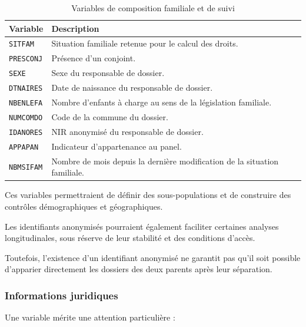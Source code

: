 \documentclass[11pt,a4paper]{article}
\begin{document}
\begin{table}[H]
\centering
\caption{Variables de composition familiale et de suivi}
\small
\begin{tabular}{p{2.4cm}p{10.6cm}}
\toprule
\textbf{Variable} & \textbf{Description} \\
\midrule
\texttt{SITFAM} &
Situation familiale retenue
pour le calcul des droits. \\

\texttt{PRESCONJ} &
Présence d'un conjoint. \\

\texttt{SEXE} &
Sexe du responsable de dossier. \\

\texttt{DTNAIRES} &
Date de naissance du responsable
de dossier. \\

\texttt{NBENLEFA} &
Nombre d'enfants à charge
au sens de la législation familiale. \\

\texttt{NUMCOMDO} &
Code de la commune du dossier. \\

\texttt{IDANORES} &
NIR anonymisé du responsable
de dossier. \\

\texttt{APPAPAN} &
Indicateur d'appartenance
au panel. \\

\texttt{NBMSIFAM} &
Nombre de mois depuis la dernière
modification de la situation familiale. \\
\bottomrule
\end{tabular}
\end{table}

Ces variables permettraient
de définir des sous-populations
et de construire des contrôles
démographiques et géographiques.

Les identifiants anonymisés
pourraient également faciliter
certaines analyses longitudinales,
sous réserve de leur stabilité
et des conditions d'accès.

Toutefois, l'existence
d'un identifiant anonymisé
ne garantit pas qu'il soit
possible d'apparier directement
les dossiers des deux parents
après leur séparation.

\subsubsection{Informations juridiques}

Une variable mérite une attention
particulière :
\end{document}

